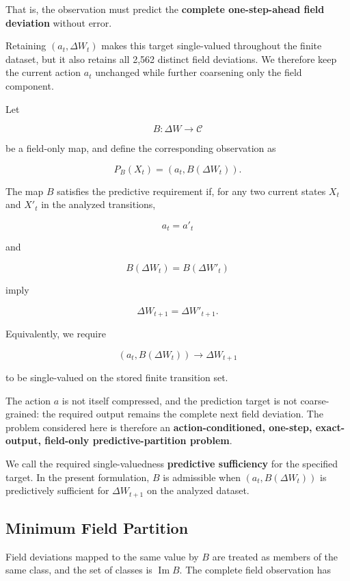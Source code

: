 \documentclass[
  11pt,
]{article}
\begin{document}
That is, the observation must predict the \textbf{complete
one-step-ahead field deviation} without error.

Retaining \({(a_t,\Delta W_t)}\) makes this target single-valued
throughout the finite dataset, but it also retains all 2,562 distinct
field deviations. We therefore keep the current action \({a_t}\)
unchanged while further coarsening only the field component.

Let

\[{B:\Delta W\longrightarrow\mathcal C}\]

be a field-only map, and define the corresponding observation as

\[{P_B(X_t)=\left(a_t,B(\Delta W_t)\right).}\]

The map \({B}\) satisfies the predictive requirement if, for any two
current states \({X_t}\) and \({X'_t}\) in the analyzed transitions,

\[{a_t=a'_t}\]

and

\[{B(\Delta W_t)=B(\Delta W'_t)}\]

imply

\[{\Delta W_{t+1}=\Delta W'_{t+1}.}\]

Equivalently, we require

\[{\left(a_t,B(\Delta W_t)\right)\longrightarrow\Delta W_{t+1}}\]

to be single-valued on the stored finite transition set.

The action \({a}\) is not itself compressed, and the prediction target
is not coarse-grained: the required output remains the complete next
field deviation. The problem considered here is therefore an
\textbf{action-conditioned, one-step, exact-output, field-only
predictive-partition problem}.

We call the required single-valuedness \textbf{predictive sufficiency}
for the specified target. In the present formulation, \({B}\) is
admissible when \({(a_t,B(\Delta W_t))}\) is predictively sufficient for
\({\Delta W_{t+1}}\) on the analyzed dataset.

\hypertarget{minimum-field-partition}{%
\subsection{Minimum Field Partition}\label{minimum-field-partition}}

Field deviations mapped to the same value by \({B}\) are treated as
members of the same class, and the set of classes is
\({\operatorname{Im}B}\). The complete field observation has
\end{document}
